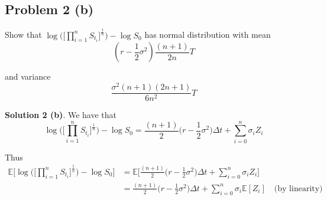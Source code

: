 \documentclass[12pt]{article}
\begin{document}
%
%
%

\subsection{Problem 2 (b)} Show that $\log \Big( \big[ \prod^{n}_{i=1} S_{t_i} \big]^{\frac{1}{n}} \Big) - \log S_0$ has normal distribution with mean
\begin{equation*}
	(r - \frac{1}{2}\sigma^2)\frac{(n + 1)}{2n}T
\end{equation*}

and variance
\begin{equation*}
	\frac{\sigma^2(n + 1)(2n + 1)}{6n^2} T
\end{equation*}

{\bf Solution 2 (b)}. We have that
\begin{equation*}
	\log \Bigg( \Bigg[ \prod^{n}_{i=1} S_{t_i} \Bigg]^{\frac{1}{n}} \Bigg) - \log S_0 = \frac{(n + 1)}{2} \Big(r - \frac{1}{2}\sigma^2 \Big)\Delta t +  \sum^n_{i = 0} \sigma_iZ_i 
\end{equation*}

Thus
\begin{align*}
	\mathbb E \Bigg[ \log \Bigg( \Bigg[ \prod^{n}_{i=1} S_{t_i} \Bigg]^{\frac{1}{n}} \Bigg) - \log S_0 \Bigg] &= \mathbb E \Bigg[ \frac{(n + 1)}{2} \Big(r - \frac{1}{2}\sigma^2 \Big)\Delta t +  \sum^n_{i = 0} \sigma_iZ_i \Bigg] \\
	&= \frac{(n + 1)}{2} \Big(r - \frac{1}{2}\sigma^2 \Big)\Delta t + \sum^n_{i = 0} \sigma_i\mathbb E [ Z_i ] \quad \text{(by linearity)}
\end{align*}
\end{document}
